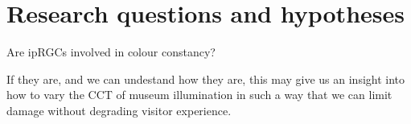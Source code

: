 \chapter{Research questions and hypotheses}

Are ipRGCs involved in colour constancy?

If they are, and we can undestand how they are, this may give us an insight into how to vary the \gls{CCT} of museum illumination in such a way that we can limit damage without degrading visitor experience.
